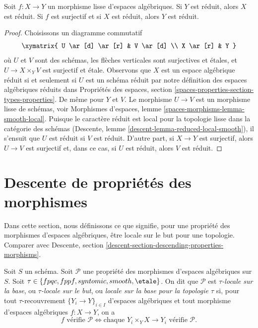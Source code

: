 \begin{lemma}
\label{lemma-reduced-local-smooth}
Soit $f : X \to Y$ un morphisme lisse d'espaces algébriques.
Si $Y$ est réduit, alors $X$ est réduit. Si $f$ est surjectif
et si $X$ est réduit, alors $Y$ est réduit.
\end{lemma}

\begin{proof}
Choisissons un diagramme commutatif
$$
\xymatrix{
U \ar[d] \ar[r] & V \ar[d] \\
X \ar[r] & Y
}
$$
où $U$ et $V$ sont des schémas, les flèches verticales sont surjectives et
\'etales, et $U \to X \times_Y V$ est surjectif et \'etale. Observons que $X$ est
un espace algébrique réduit si et seulement si $U$ est un schéma réduit
par notre définition des espaces algébriques réduits dans
Propriétés des espaces, section \ref{spaces-properties-section-types-properties}.
De même pour $Y$ et $V$. 
Le morphisme $U \to V$ est un morphisme lisse de schémas, voir
Morphismes d'espaces, lemme \ref{spaces-morphisms-lemma-smooth-local}.
Puisque le caractère réduit est local pour la topologie lisse dans la catégorie des
schémas (Descente, lemme \ref{descent-lemma-reduced-local-smooth}),
il s'ensuit que $U$ est réduit si $V$ est réduit.
D'autre part, si $X \to Y$ est surjectif, alors $U \to V$ est
surjectif et, dans ce cas, si $U$ est réduit, alors $V$ est réduit.
\end{proof}







\section{Descente de propriétés des morphismes}
\label{section-descending-properties-morphisms}

\noindent
Dans cette section, nous définissons ce que signifie, pour une propriété des morphismes
d'espaces algébriques, être locale sur le but pour une topologie. Comparer avec
Descente, section \ref{descent-section-descending-properties-morphisms}.

\begin{definition}
\label{definition-property-morphisms-local}
Soit $S$ un schéma.
Soit $\mathcal{P}$ une propriété des morphismes d'espaces algébriques sur $S$.
Soit $\tau \in \{fpqc, fppf, syntomic, smooth, \etale\}$.
On dit que $\mathcal{P}$ est {\it $\tau$-locale sur la base}, ou
{\it $\tau$-locale sur le but}, ou
{\it locale sur la base pour la topologie $\tau$} si, pour tout
$\tau$-recouvrement $\{Y_i \to Y\}_{i \in I}$ d'espaces algébriques
et tout morphisme d'espaces algébriques $f : X \to Y$, on
a
$$
f \text{ vérifie }\mathcal{P}
\Leftrightarrow
\text{chaque }Y_i \times_Y X \to Y_i\text{ vérifie }\mathcal{P}.
$$
\end{definition}

